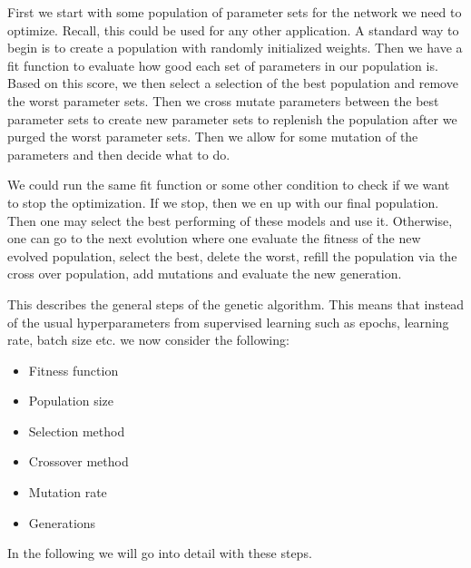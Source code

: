 \documentclass[12pt,a4paper]{article} %
\numberwithin{equation}{section}
\begin{document}
		First we start with some population of parameter sets for the network we need to optimize. Recall, this could be used for any other application. A standard way to begin is to create a population with randomly initialized weights. Then we have a fit function to evaluate how good each set of parameters in our population is. Based on this score, we then select a selection of the best population and remove the worst parameter sets. Then we cross mutate parameters between the best parameter sets to create new parameter sets to replenish the population after we purged the worst parameter sets. Then we allow for some mutation of the parameters and then decide what to do.
		
		We could run the same fit function or some other condition to check if we want to stop the optimization. If we stop, then we en up with our final population. Then one may select the best performing of these models and use it. Otherwise, one can go to the next evolution where one evaluate the fitness of the new evolved population, select the best, delete the worst, refill the population via the cross over population, add mutations and evaluate the new generation.
		
		This describes the general steps of the genetic algorithm. This means that instead of the usual hyperparameters from supervised learning such as epochs, learning rate, batch size etc. we now consider the following:
		\begin{itemize}
			\item Fitness function
			\item Population size
			\item Selection method
			\item Crossover method
			\item Mutation rate
			\item Generations
		\end{itemize}
		In the following we will go into detail with these steps.
		
\end{document}
